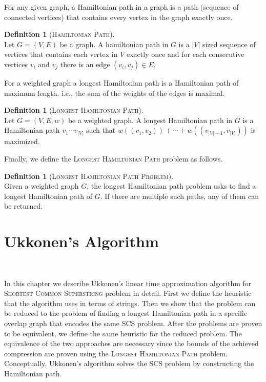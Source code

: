 \documentclass[english,twoside,censored,csm,algorithms-track-2020]{HYthesisML}
\theoremstyle{plain}
\theoremstyle{definition}
\newtheorem{definition}[theorem]{Definition}
\numberwithin{testexample}{chapter}
\begin{document}
For any given graph, a Hamiltonian path in a graph is a path (sequence of connected vertices)
that contains every vertex in the graph exactly once.

\begin{definition}[\textsc{Hamiltonian Path}]~\label{def-hampath}\\
  Let $G=(V,E)$ be a graph. A hamiltonian path in $G$ is a $|V|$ sized sequence of vertices
  that contains each vertex in $V$ exactly once and for each consecutive vertices $v_i$ and
  $v_j$ there is an edge $(v_i,v_j)\in E$.
\end{definition}

For a weighted graph a longest Hamiltonian path is a Hamiltonian path of maximum length.
i.e., the sum of the weights of the edges is maximal.

\begin{definition}[\textsc{Longest Hamiltonian Path}]~\label{def-longest-hampath}\\
  Let $G=(V,E,w)$ be a weighted graph. A longest Hamiltonian path in $G$ is a Hamiltonian
  path $v_1\cdots v_{|V|}$ such that $w((v_1,v_2))+\cdots +w((v_{|V|-1},v_{|V|}))$ is maximized.
\end{definition}

Finally, we define the \textsc{Longest Hamiltonian Path} problem as follows.

\begin{definition}[\textsc{Longest Hamiltonian Path Problem}]~\label{def-longest-hampat-problem}\\
  Given a weighted graph $G$, the longest Hamiltonian path problem asks to find a
  longest Hamiltonian path of $G$. If there are multiple such paths, any of them can
  be returned.
\end{definition}

\chapter{Ukkonen's Algorithm}~\label{chp-ukkonen}

In this chapter we describe Ukkonen's linear time approximation algorithm \citep{Ukkonen90} for
\textsc{Shortest Common Superstring} problem in detail. First we define the heuristic that the
algorithm uses in terms of strings. Then we show that the problem can be reduced to the problem
of finding a longest Hamiltonian path in a specific overlap graph that encodes the same SCS problem.
After the problems are proven to be equivalent, we define the same heuristic for the reduced problem.
The equivalence of the two approaches are necessary since the bounds of the achieved compression
are proven using the \textsc{Longest Hamiltonian Path} problem. Conceptually, Ukkonen's algorithm 
solves the SCS problem by constructing the Hamiltonian path.
\end{document}
